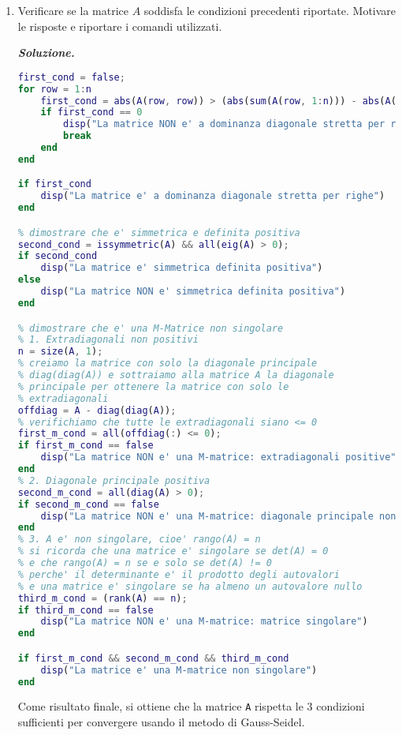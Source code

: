 \begin{enumerate}
    \item Verificare se la matrice $A$ soddisfa le condizioni precedenti riportate. Motivare le risposte e riportare i comandi utilizzati.

    \textcolor{Green3}{\textbf{\emph{Soluzione.}}}
    \begin{lstlisting}[language=MATLAB]
first_cond = false;
for row = 1:n
    first_cond = abs(A(row, row)) > (abs(sum(A(row, 1:n))) - abs(A(row, row)));
    if first_cond == 0
        disp("La matrice NON e' a dominanza diagonale stretta per righe")
        break
    end
end

if first_cond
    disp("La matrice e' a dominanza diagonale stretta per righe")
end

% dimostrare che e' simmetrica e definita positiva
second_cond = issymmetric(A) && all(eig(A) > 0);
if second_cond
    disp("La matrice e' simmetrica definita positiva")
else
    disp("La matrice NON e' simmetrica definita positiva")
end

% dimostrare che e' una M-Matrice non singolare
% 1. Extradiagonali non positivi
n = size(A, 1);
% creiamo la matrice con solo la diagonale principale
% diag(diag(A)) e sottraiamo alla matrice A la diagonale
% principale per ottenere la matrice con solo le
% extradiagonali
offdiag = A - diag(diag(A));
% verifichiamo che tutte le extradiagonali siano <= 0
first_m_cond = all(offdiag(:) <= 0);
if first_m_cond == false
    disp("La matrice NON e' una M-matrice: extradiagonali positive")
end
% 2. Diagonale principale positiva
second_m_cond = all(diag(A) > 0);
if second_m_cond == false
    disp("La matrice NON e' una M-matrice: diagonale principale non positiva")
end
% 3. A e' non singolare, cioe' rango(A) = n
% si ricorda che una matrice e' singolare se det(A) = 0
% e che rango(A) = n se e solo se det(A) != 0
% perche' il determinante e' il prodotto degli autovalori
% e una matrice e' singolare se ha almeno un autovalore nullo
third_m_cond = (rank(A) == n);
if third_m_cond == false
    disp("La matrice NON e' una M-matrice: matrice singolare")
end

if first_m_cond && second_m_cond && third_m_cond
    disp("La matrice e' una M-matrice non singolare")
end\end{lstlisting}
    Come risultato finale, si ottiene che la matrice \texttt{A} rispetta le 3 condizioni sufficienti per convergere usando il metodo di Gauss-Seidel.
\end{enumerate}